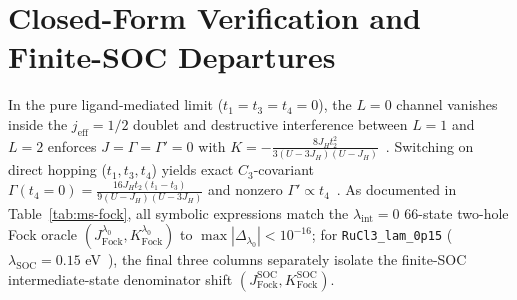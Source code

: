 \documentclass[11pt,a4paper]{article}
\begin{document}
\section{Closed-Form Verification and Finite-SOC Departures}
In the pure ligand-mediated limit ($t_1=t_3=t_4=0$), the $L=0$ channel vanishes inside the $j_{\mathrm{eff}}=1/2$ doublet and destructive interference between $L=1$ and $L=2$ enforces $J=\Gamma=\Gamma'=0$ with $K = -\frac{8J_H t_2^2}{3(U-3J_H)(U-J_H)}$~\cite{Jackeli2009}. Switching on direct hopping ($t_1, t_3, t_4$) yields exact $C_3$-covariant $\Gamma(t_4=0) = \frac{16J_H t_2 (t_1 - t_3)}{9(U-J_H)(U-3J_H)}$ and nonzero $\Gamma' \propto t_4$~\cite{RauLeeKee2014}. As documented in Table~\ref{tab:ms-fock}, all symbolic expressions match the $\lambda_{\mathrm{int}}=0$ $66$-state two-hole Fock oracle $(J_{\mathrm{Fock}}^{\lambda_0}, K_{\mathrm{Fock}}^{\lambda_0})$ to $\max|\Delta_{\lambda_0}| < 10^{-16}$; for \texttt{RuCl3\_lam\_0p15} ($\lambda_{\mathrm{SOC}} = 0.15$ eV~\cite{Winter2016}), the final three columns separately isolate the finite-SOC intermediate-state denominator shift $(J_{\mathrm{Fock}}^{\mathrm{SOC}}, K_{\mathrm{Fock}}^{\mathrm{SOC}})$.

\begin{table}[htbp]
  \centering
  \scriptsize
  \caption{Cross-verification of symbolic \texttt{SymPy} exchange tensors against the independent $66$-state Fock oracle at $\lambda_{\mathrm{int}}=0$ (showing exact parity $\max|\Delta_{\lambda_0}| < 10^{-16}$) alongside finite-$\lambda_{\mathrm{SOC}}$ intermediate-state values.}
  \label{tab:ms-fock}
\end{table}
\end{document}
